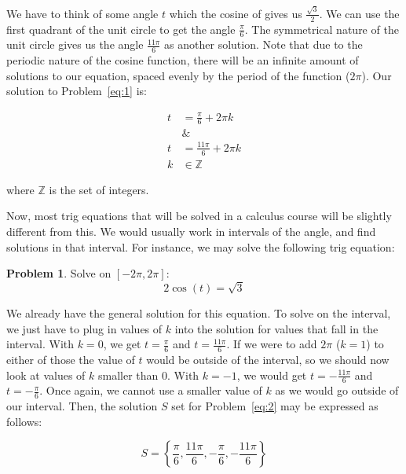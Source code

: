 \documentclass[12pt]{article}
\theoremstyle{definition}
\newtheorem{problem}{Problem}
\begin{document}
We have to think of some angle $t$ which the cosine of gives us $\frac{\sqrt{3}}{2}$.
We can use the first quadrant of the unit circle to get the angle $\frac{\pi}{6}$.
The symmetrical nature of the unit circle gives us the angle $\frac{11\pi}{6}$ as another solution.
Note that due to the periodic nature of the cosine function, there will be an infinite amount of solutions to our equation, spaced evenly by the period of the function ($2\pi$).
Our solution to Problem~\eqref{eq:1} is:

\begin{align}
    t         & = \frac{\pi}{6} + 2\pi k   \\
    \nonumber & \&                         \\
    t         & = \frac{11\pi}{6} + 2\pi k \\
    k         & \in \mathbb{Z}
\end{align}

where $\mathbb{Z}$ is the set of integers.

Now, most trig equations that will be solved in a calculus course will be slightly different from this.
We would usually work in intervals of the angle, and find solutions in that interval.
For instance, we may solve the following trig equation:


\begin{problem}
Solve on $\displaystyle [-2\pi, 2\pi]$:
\begin{equation*}
    {2\cos(t) = \sqrt{3}} \label{eq:2}
\end{equation*}
\end{problem}

We already have the general solution for this equation.
To solve on the interval, we just have to plug in values of $k$ into the solution for values that fall in the interval.
With $k=0$, we get $t=\frac{\pi}{6}$ and $t=\frac{11\pi}{6}$.
If we were to add $2\pi$ ($k=1$) to either of those the value of $t$ would be outside of the interval, so we should now look at values of $k$ smaller than $0$.
With $k=-1$, we would get $t=-\frac{11\pi}{6}$ and $t=-\frac{\pi}{6}$.
Once again, we cannot use a smaller value of $k$ as we would go outside of our interval.
Then, the solution $S$ set for Problem~\eqref{eq:2} may be expressed as follows:

\begin{equation}
    S = \left\{ \frac{\pi}{6}, \frac{11\pi}{6}, -\frac{\pi}{6}, -\frac{11\pi}{6} \right\}
\end{equation}
\end{document}
